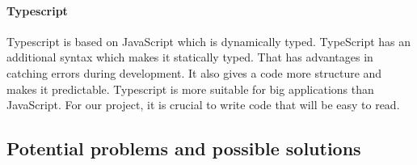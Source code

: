 \paragraph*{Typescript} Typescript is based on JavaScript which is dynamically typed. TypeScript has an additional syntax which makes it statically typed. That has advantages in catching errors during development. It also gives a code more structure and makes it predictable. Typescript is more suitable for big applications than JavaScript. For our project, it is crucial to write code that will be easy to read.




\subsection{Potential problems and possible solutions}